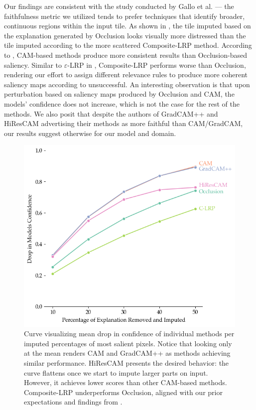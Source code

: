 Our findings are consistent with the study conducted by Gallo et al. \cite{gallo} --- the faithfulness metric we utilized tends to prefer techniques that identify broader, continuous regions within the input tile.
As shown in , the tile imputed based on the explanation generated by Occlusion looks visually more distressed than the tile imputed according to the more scattered Composite-LRP method.
According to , CAM-based methods produce more consistent results than Occlusion-based saliency.
Similar to $\varepsilon$-LRP in \cite{gallo}, Composite-LRP performs worse than Occlusion, rendering our effort to assign different relevance rules to produce more coherent saliency maps according to \cite{lrp, lrp-alpha-beta} unsuccessful.
An interesting observation is that upon perturbation based on saliency maps produced by Occlusion and CAM, the models' confidence does not increase, which is not the case for the rest of the methods.
We also posit that despite the authors of GradCAM++ and HiResCAM \cite{grad-cam, hires-cam} advertising their methods as more faithful than CAM/GradCAM, our results suggest otherwise for our model and domain.

\begin{figure}
    \begin{center}
    \begin{minipage}{0.7\textwidth}
      \includegraphics[width=\textwidth]{img/road-curve.png}
    \end{minipage}
    \caption{Curve visualizing mean drop in confidence of individual methods per imputed percentages of most salient pixels. Notice that looking only at the mean renders CAM and GradCAM++ as methods achieving similar performance. HiResCAM presents the desired behavior: the curve flattens once we start to impute larger parts on input. However, it achieves lower scores than other CAM-based methods. Composite-LRP underperforms Occlusion, aligned with our prior expectations and findings from \cite{gallo}.}
    \label{fig:road-curve}
    \end{center}
\end{figure}

